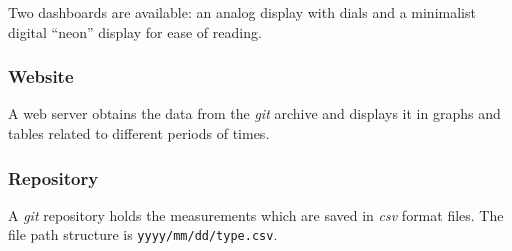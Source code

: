 \documentclass[12pt, a4paper]{article}
\begin{document}
Two dashboards are available: an analog display with dials and a minimalist digital ``neon'' display for ease of reading.
\subsubsection{Website}

A web server obtains the data from the \emph{git} archive and displays it in graphs and tables related to different periods of times.

\subsubsection{Repository}

A \emph{git} repository holds the measurements which are saved in \emph{csv} format files.
The file path structure is \texttt{yyyy/mm/dd/type.csv}.
\end{document}
